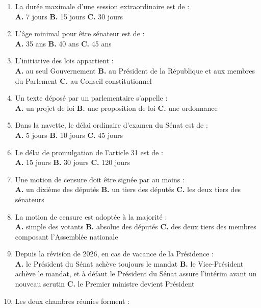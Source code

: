 \documentclass[11pt,a4paper,oneside]{report}
\begin{document}
\begin{enumerate}[label=\textbf{Q\arabic*.},leftmargin=2.4em]
  \textbf{A.} janvier, mai et septembre \quad \textbf{B.} mars, juin et novembre \quad \textbf{C.} février, juillet et décembre
  \item La durée maximale d'une session extraordinaire est de :\\
  \textbf{A.} 7 jours \quad \textbf{B.} 15 jours \quad \textbf{C.} 30 jours
  \item L'âge minimal pour être sénateur est de :\\
  \textbf{A.} 35 ans \quad \textbf{B.} 40 ans \quad \textbf{C.} 45 ans
  \item L'initiative des lois appartient :\\
  \textbf{A.} au seul Gouvernement \quad \textbf{B.} au Président de la République et aux membres du Parlement \quad \textbf{C.} au Conseil constitutionnel
  \item Un texte déposé par un parlementaire s'appelle :\\
  \textbf{A.} un projet de loi \quad \textbf{B.} une proposition de loi \quad \textbf{C.} une ordonnance
  \item Dans la navette, le délai ordinaire d'examen du Sénat est de :\\
  \textbf{A.} 5 jours \quad \textbf{B.} 10 jours \quad \textbf{C.} 45 jours
  \item Le délai de promulgation de l'article 31 est de :\\
  \textbf{A.} 15 jours \quad \textbf{B.} 30 jours \quad \textbf{C.} 120 jours
  \item Une motion de censure doit être signée par au moins :\\
  \textbf{A.} un dixième des députés \quad \textbf{B.} un tiers des députés \quad \textbf{C.} les deux tiers des sénateurs
  \item La motion de censure est adoptée à la majorité :\\
  \textbf{A.} simple des votants \quad \textbf{B.} absolue des députés \quad \textbf{C.} des deux tiers des membres composant l'Assemblée nationale
  \item Depuis la révision de 2026, en cas de vacance de la Présidence :\\
  \textbf{A.} le Président du Sénat achève toujours le mandat \quad \textbf{B.} le Vice-Président achève le mandat, et à défaut le Président du Sénat assure l'intérim avant un nouveau scrutin \quad \textbf{C.} le Premier ministre devient Président
  \item Les deux chambres réunies forment :\\

\end{enumerate}
\end{document}
